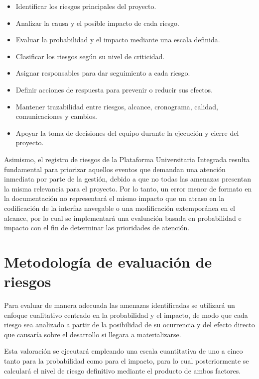 \documentclass[11pt,spanish]{article}
\begin{document}
\begin{itemize}[leftmargin=*, label={\textbullet}]
    \item Identificar los riesgos principales del proyecto.
    \item Analizar la causa y el posible impacto de cada riesgo.
    \item Evaluar la probabilidad y el impacto mediante una escala definida.
    \item Clasificar los riesgos según su nivel de criticidad.
    \item Asignar responsables para dar seguimiento a cada riesgo.
    \item Definir acciones de respuesta para prevenir o reducir sus efectos.
    \item Mantener trazabilidad entre riesgos, alcance, cronograma, calidad, comunicaciones y cambios.
    \item Apoyar la toma de decisiones del equipo durante la ejecución y cierre del proyecto.
\end{itemize}

Asimismo, el registro de riesgos de la Plataforma Universitaria Integrada resulta fundamental para priorizar aquellos eventos que demandan una atención inmediata por parte de la gestión, debido a que no todas las amenazas presentan la misma relevancia para el proyecto. Por lo tanto, un error menor de formato en la documentación no representará el mismo impacto que un atraso en la codificación de la interfaz navegable o una modificación extemporánea en el alcance, por lo cual se implementará una evaluación basada en probabilidad e impacto con el fin de determinar las prioridades de atención.

\section{Metodología de evaluación de riesgos}

Para evaluar de manera adecuada las amenazas identificadas se utilizará un enfoque cualitativo centrado en la probabilidad y el impacto, de modo que cada riesgo sea analizado a partir de la posibilidad de su ocurrencia y del efecto directo que causaría sobre el desarrollo si llegara a materializarse.

Esta valoración se ejecutará empleando una escala cuantitativa de uno a cinco tanto para la probabilidad como para el impacto, para lo cual posteriormente se calculará el nivel de riesgo definitivo mediante el producto de ambos factores.
\end{document}

